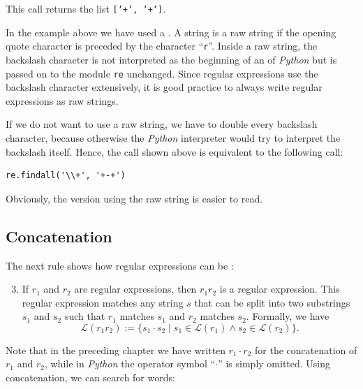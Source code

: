 \noindent
This call returns the list \texttt{['+', '+']}.

\remarkEng
In the example above we have used a .  A string is a raw string if the
opening quote character is preceded by the character ``\texttt{r}''.  Inside a raw string, the backslash
character is not interpreted as the beginning of an  of \textsl{Python} but is passed on
to the module \texttt{re} unchanged.  Since regular expressions use the backslash character extensively, it is
good practice to always write regular expressions as raw strings.

If we do not want to use a raw string, we have to double every backslash character, because otherwise the
\textsl{Python} interpreter would try to interpret the backslash itself.  Hence, the call shown above is
equivalent to the following call:

\begin{verbatim}
re.findall('\\+', '+-+')
\end{verbatim}

\noindent
Obviously, the version using the raw string is easier to read.
\eox

\subsection{Concatenation}
The next rule shows how regular expressions can be :
\begin{enumerate}
\setcounter{enumi}{2}
\item If $r_1$ and $r_2$ are regular expressions, then $r_1r_2$ is a regular expression.  This regular
      expression matches any string $s$ that can be split into two substrings $s_1$ and $s_2$ such that $r_1$
      matches $s_1$ and $r_2$ matches $s_2$.  Formally, we have
      $$\mathcal{L}(r_1r_2) := \bigl\{ s_1 \cdot s_2 \mid s_1 \in \mathcal{L}(r_1) \wedge 
                                       s_2 \in \mathcal{L}(r_2) \bigr\}.
      $$
\end{enumerate}
Note that in the preceding chapter we have written $r_1 \cdot r_2$ for the concatenation of $r_1$ and $r_2$,
while in \textsl{Python} the operator symbol ``$\cdot$'' is simply omitted.  Using concatenation, we can search
for words:

